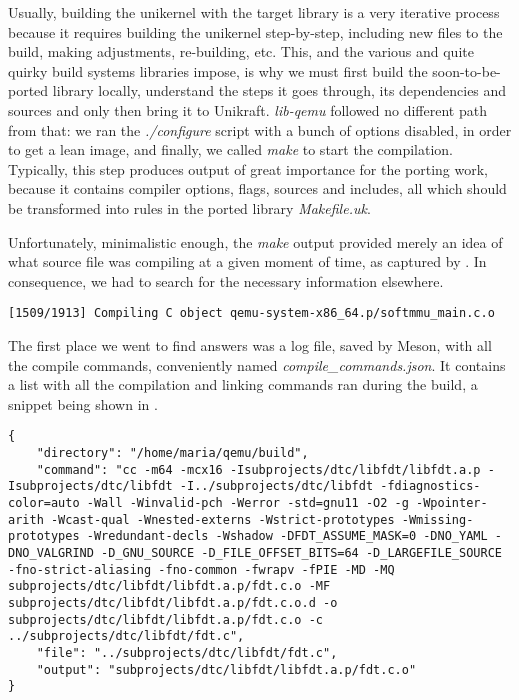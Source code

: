Usually, building the unikernel with the target library is a very iterative process because it requires building the unikernel step-by-step, including new files to the build, making adjustments, re-building, etc.
This, and the various and quite quirky build systems libraries impose, is why we must first build the soon-to-be-ported library locally, understand the steps it goes through, its dependencies and sources and only then bring it to Unikraft.
\textit{lib-qemu} followed no different path from that: we ran the \textit{./configure} script with a bunch of options disabled, in order to get a lean image, and finally, we called \textit{make} to start the compilation.
Typically, this step produces output of great importance for the porting work, because it contains compiler options, flags, sources and includes, all which should be transformed into rules in the ported library \textit{Makefile.uk}.

Unfortunately, minimalistic enough, the \textit{make} output provided merely an idea of what source file was compiling at a given moment of time, as captured by .
In consequence, we had to search for the necessary information elsewhere. 

\begin{lstlisting}
[1509/1913] Compiling C object qemu-system-x86_64.p/softmmu_main.c.o
\end{lstlisting}

The first place we went to find answers was a log file, saved by Meson, with all the compile commands, conveniently named \textit{compile_commands.json}.
It contains a list with all the compilation and linking commands ran during the build, a snippet being shown in .

\begin{lstlisting}
{
    "directory": "/home/maria/qemu/build",
    "command": "cc -m64 -mcx16 -Isubprojects/dtc/libfdt/libfdt.a.p -Isubprojects/dtc/libfdt -I../subprojects/dtc/libfdt -fdiagnostics-color=auto -Wall -Winvalid-pch -Werror -std=gnu11 -O2 -g -Wpointer-arith -Wcast-qual -Wnested-externs -Wstrict-prototypes -Wmissing-prototypes -Wredundant-decls -Wshadow -DFDT_ASSUME_MASK=0 -DNO_YAML -DNO_VALGRIND -D_GNU_SOURCE -D_FILE_OFFSET_BITS=64 -D_LARGEFILE_SOURCE -fno-strict-aliasing -fno-common -fwrapv -fPIE -MD -MQ subprojects/dtc/libfdt/libfdt.a.p/fdt.c.o -MF subprojects/dtc/libfdt/libfdt.a.p/fdt.c.o.d -o subprojects/dtc/libfdt/libfdt.a.p/fdt.c.o -c ../subprojects/dtc/libfdt/fdt.c",
    "file": "../subprojects/dtc/libfdt/fdt.c",
    "output": "subprojects/dtc/libfdt/libfdt.a.p/fdt.c.o"
}
\end{lstlisting}

